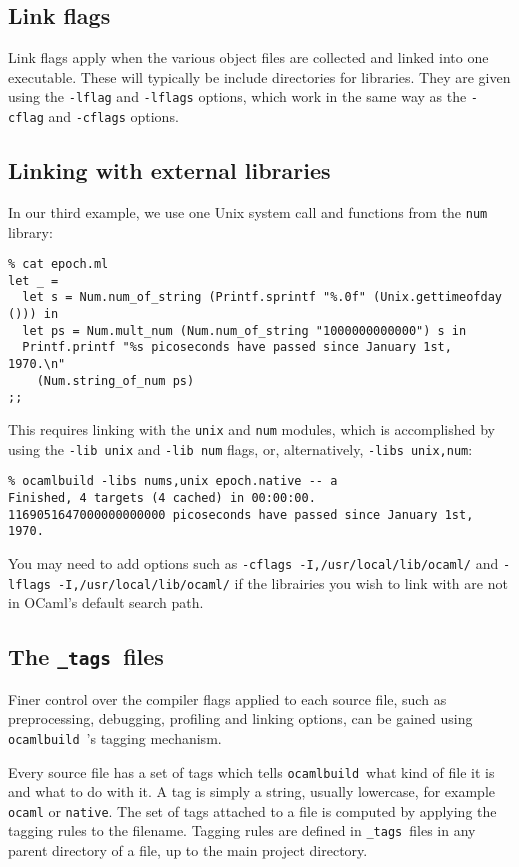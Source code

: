 \documentclass[12pt]{article}
\newcommand{\ocb}{\texttt{ocamlbuild}~}
\newcommand{\tags}{\texttt{\_tags}~}
\begin{document}
\subsection{Link flags}
Link flags apply when the various object files are collected and linked into
one executable.  These will typically be include directories for libraries.
They are given using the \texttt{-lflag} and \texttt{-lflags} options, which
work in the same way as the \texttt{-cflag} and \texttt{-cflags} options.
\subsection{Linking with external libraries}
In our third example, we use one Unix system call and functions from the \texttt{num}
library:
\begin{verbatim}
% cat epoch.ml
let _ =
  let s = Num.num_of_string (Printf.sprintf "%.0f" (Unix.gettimeofday ())) in
  let ps = Num.mult_num (Num.num_of_string "1000000000000") s in
  Printf.printf "%s picoseconds have passed since January 1st, 1970.\n"
    (Num.string_of_num ps)
;;
\end{verbatim}
This requires linking with the \texttt{unix} and \texttt{num} modules, which is accomplished
by using the \texttt{-lib unix} and \texttt{-lib num} flags, or, alternatively, \texttt{-libs unix,num}:
\begin{verbatim}
% ocamlbuild -libs nums,unix epoch.native -- a
Finished, 4 targets (4 cached) in 00:00:00.
1169051647000000000000 picoseconds have passed since January 1st, 1970.
\end{verbatim}
You may need to add options such as \texttt{-cflags -I,/usr/local/lib/ocaml/}
and \texttt{-lflags -I,/usr/local/lib/ocaml/} if the librairies you wish to
link with are not in OCaml's default search path.
\subsection{The \tags files}
Finer control over the compiler flags applied to each source file, such as
preprocessing, debugging, profiling and linking options, can be gained using
\ocb's tagging mechanism.

Every source file has a set of tags which tells \ocb what kind of file it is
and what to do with it.  A tag is simply a string, usually lowercase, for
example \texttt{ocaml} or \texttt{native}.  The set of tags attached to a file
is computed by applying the tagging rules to the filename.  Tagging rules are
defined in \tags files in any parent directory of a file, up to the main
project directory.
\end{document}
